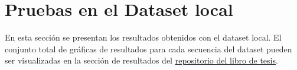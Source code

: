%
%
%
%
%
%
%
%
%
%
%
%
%
%
%
%
\section{Pruebas en el Dataset local}

En esta sección se presentan los resultados obtenidos con el dataset local.  El conjunto total de gráficas de resultados para cada secuencia del dataset pueden ser visualizadas en la sección de resultados del  \href{https://github.com/Lujano/tesis/tree/master/imagenes/Resultados/}{\underline{repositorio del libro de tesis}}.

